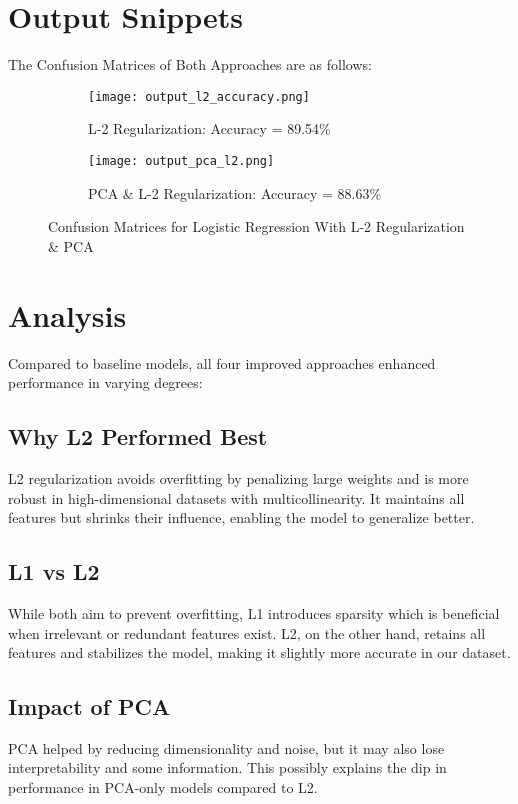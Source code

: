 \documentclass[a4paper,11pt]{article}
\begin{document}
\section*{Output Snippets}
The Confusion Matrices of Both Approaches are as follows:
\begin{figure}[H]
    \centering
    \begin{subfigure}[b]{0.48\textwidth}
        \texttt{[image: output\_l2\_accuracy.png]}
        \caption{L-2 Regularization: Accuracy = 89.54\%}
    \end{subfigure}
    \hfill
    \begin{subfigure}[b]{0.48\textwidth}
        \texttt{[image: output\_pca\_l2.png]}
        \caption{PCA \& L-2 Regularization: Accuracy = 88.63\%}
    \end{subfigure}
    \caption{Confusion Matrices for Logistic Regression With L-2 Regularization \& PCA}
    \label{fig:conf_matrices}
\end{figure}



\section{Analysis}
Compared to baseline models, all four improved approaches enhanced performance in varying degrees:

\subsection*{Why L2 Performed Best}
L2 regularization avoids overfitting by penalizing large weights and is more robust in high-dimensional datasets with multicollinearity. It maintains all features but shrinks their influence, enabling the model to generalize better.

\subsection*{L1 vs L2}
While both aim to prevent overfitting, L1 introduces sparsity which is beneficial when irrelevant or redundant features exist. L2, on the other hand, retains all features and stabilizes the model, making it slightly more accurate in our dataset.

\subsection*{Impact of PCA}
PCA helped by reducing dimensionality and noise, but it may also lose interpretability and some information. This possibly explains the dip in performance in PCA-only models compared to L2.
\end{document}
